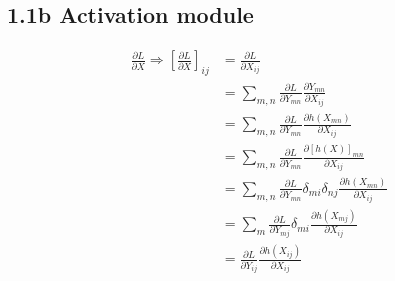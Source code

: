 \documentclass{article}
\begin{document}
\subsection*{1.1b Activation module}
\begin{align*}
  \frac{\partial L}{\partial X} \Rightarrow \left[\frac{\partial L}{\partial X}\right]_{ij} &= \frac{\partial L}{\partial X_{ij}} \\
                                                                                            &= \sum_{m,n}\frac{\partial L}{\partial Y_{mn}} \frac{\partial Y_{mn}}{\partial X_{ij}} \\
                                                                                            &= \sum_{m,n}\frac{\partial L}{\partial Y_{mn}} \frac{\partial h(X_{mn})}{\partial X_{ij}} \\
                                                                                            &= \sum_{m,n}\frac{\partial L}{\partial Y_{mn}} \frac{\partial [h(X)]_{mn}}{\partial X_{ij}} \\
                                                                                            &= \sum_{m,n}\frac{\partial L}{\partial Y_{mn}} \delta_{mi}\delta_{nj}\frac{\partial h(X_{mn})}{\partial X_{ij}} \\
                                                                                            &= \sum_{m}\frac{\partial L}{\partial Y_{mj}} \delta_{mi}\frac{\partial h(X_{mj})}{\partial X_{ij}} \\
  &= \frac{\partial L}{\partial Y_{ij}} \frac{\partial h(X_{ij})}{\partial X_{ij}} \\
\end{align*}
\end{document}
